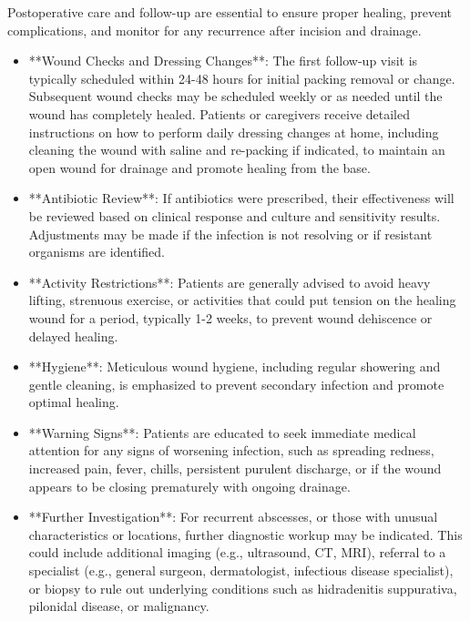 Postoperative care and follow-up are essential to ensure proper healing, prevent complications, and monitor for any recurrence after incision and drainage.

\begin{itemize}
  \item **Wound Checks and Dressing Changes**: The first follow-up visit is typically scheduled within 24-48 hours for initial packing removal or change. Subsequent wound checks may be scheduled weekly or as needed until the wound has completely healed. Patients or caregivers receive detailed instructions on how to perform daily dressing changes at home, including cleaning the wound with saline and re-packing if indicated, to maintain an open wound for drainage and promote healing from the base.

  \item **Antibiotic Review**: If antibiotics were prescribed, their effectiveness will be reviewed based on clinical response and culture and sensitivity results. Adjustments may be made if the infection is not resolving or if resistant organisms are identified.

  \item **Activity Restrictions**: Patients are generally advised to avoid heavy lifting, strenuous exercise, or activities that could put tension on the healing wound for a period, typically 1-2 weeks, to prevent wound dehiscence or delayed healing.

  \item **Hygiene**: Meticulous wound hygiene, including regular showering and gentle cleaning, is emphasized to prevent secondary infection and promote optimal healing.

  \item **Warning Signs**: Patients are educated to seek immediate medical attention for any signs of worsening infection, such as spreading redness, increased pain, fever, chills, persistent purulent discharge, or if the wound appears to be closing prematurely with ongoing drainage.

  \item **Further Investigation**: For recurrent abscesses, or those with unusual characteristics or locations, further diagnostic workup may be indicated. This could include additional imaging (e.g., ultrasound, CT, MRI), referral to a specialist (e.g., general surgeon, dermatologist, infectious disease specialist), or biopsy to rule out underlying conditions such as hidradenitis suppurativa, pilonidal disease, or malignancy.
\end{itemize}

